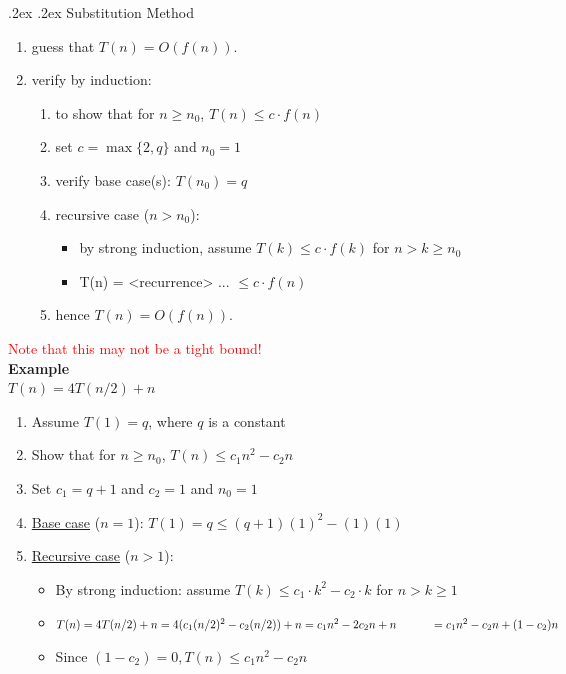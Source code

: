 \documentclass[10pt,landscape,a4paper]{article}
\makeatletter
\renewcommand{\subsubsection}{\@startsection{subsubsection}{1}{0mm}%
    {.2ex}%
    {.2ex}%
    {\rmfamily\bfseries}}
\makeatother
\begin{document}
\begin{multicols*}{4}
	\subsubsection{Substitution Method}
	\begin{enumerate}
		\item guess that $T(n) = O(f(n))$. 
		\item verify by induction:
		\begin{enumerate}
			\item to show that for $n \geq n_0$, $T(n) \leq c \cdot f(n)$
			\item set $c = \max\{2, q\}$ and $n_0 = 1$
			\item verify base case(s): $T(n_0) = q$
			\item recursive case ($n > n_0$):
			\begin{itemize}
				\item by strong induction, assume $T(k) \leq c \cdot f(k)$ for $n > k \geq n_0$
				\item T(n) = <recurrence> ... $\leq c \cdot f(n)$
			\end{itemize}
			\item hence $T(n) = O(f(n))$.
		\end{enumerate}
	\end{enumerate}
	\textcolor{red}{Note that this may not be a tight bound!}
	\\ \textbf{Example}
	\\ $T(n)=4T(n/2)+n$
	\begin{enumerate}         
		\item Assume $T(1)=q$, where $q$ is a constant
		\item Show that for $n\geq n_0$, $T(n)\leq c_1n^2-c_2n$
		\item Set $c_1=q+1$ and $c_2=1$ and $n_0=1$
		\item \underline{Base case} ($n=1$): $T(1)=q\leq (q+1) (1)^2-(1)(1)$
		\item \underline{Recursive case} ($n>1$): 
		\begin{itemize}
			\item By strong induction: assume $T(k)\leq c_1\cdot k^2-c_2\cdot k$ for $n>k\geq 1$
			\item $T(n)=4T(n/2)+n=4(c_1(n/2)^2-c_2(n/2))+n=c_1n^2-2c_2n+n
			\\\null\quad\qquad=c_1n^2-c_2n+(1-c_2)n$
			\item Since $(1-c_2)=0,T(n)\leq c_1n^2-c_2n$
		\end{itemize}
	\end{enumerate}

\end{multicols*}
\end{document}
